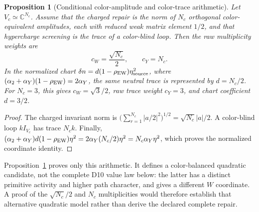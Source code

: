 \documentclass[11pt]{article}
\newtheorem{proposition}[theorem]{Proposition}
\begin{document}
\begin{proposition}[Conditional color-amplitude and color-trace
arithmetic]\label{prop:conditional-ew-color-weights}
Let \(V_c\simeq\mathbb C^{N_c}\).  Assume that the charged repair is the norm
of \(N_c\) orthogonal color-equivalent amplitudes, each with reduced weak
matrix element \(1/2\), and that hypercharge screening is the trace of a
color-blind loop.  Then the raw multiplicity weights are
\[
c_W=\frac{\sqrt{N_c}}2,
\qquad
c_Y=N_c.
\]
In the normalized chart
\(\delta n=d(1-\rho_{\rm EW})\eta_{\rm source}^2\), where
\((\alpha_2+\alpha_Y)(1-\rho_{\rm EW})=2\alpha_Y\), the same neutral trace is
represented by \(d=N_c/2\).  For \(N_c=3\), this gives
\(c_W=\sqrt3/2\), raw trace weight \(c_Y=3\), and chart coefficient
\(d=3/2\).
\end{proposition}

\begin{proof}
The charged invariant norm is
\(\bigl(\sum_{r=1}^{N_c}|a/2|^2\bigr)^{1/2}
=\sqrt{N_c}|a|/2\).  A color-blind loop \(kI_{V_c}\) has trace \(N_ck\).
Finally,
\((\alpha_2+\alpha_Y)d(1-\rho_{\rm EW})\eta^2
=2\alpha_Y(N_c/2)\eta^2=N_c\alpha_Y\eta^2\), which proves the normalized
coordinate identity.
\end{proof}

Proposition~\ref{prop:conditional-ew-color-weights} proves only this
arithmetic. It defines a color-balanced quadratic candidate,
not the complete D10 value law below: the latter has a distinct primitive
activity and higher path character, and gives a different \(W\) coordinate.
A proof of the \(\sqrt{N_c}/2\) and \(N_c\) multiplicities would therefore
establish that alternative quadratic model rather than derive the declared
complete repair.
\end{document}
